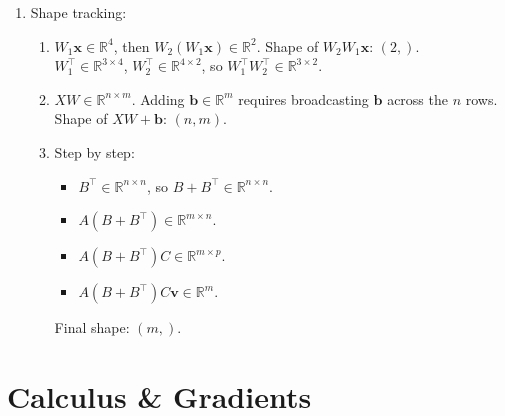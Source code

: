 \documentclass[12pt, a4paper]{scrartcl}
\begin{document}
\begin{enumerate}
\begin{enumerate}
    Note: $AA^\top \neq A^\top A$ --- they are not even the same size.
\end{enumerate}

\item Shape tracking:
\begin{enumerate}
    \item $W_1\mathbf{x} \in \mathbb{R}^4$, then $W_2(W_1\mathbf{x}) \in \mathbb{R}^2$. Shape of $W_2W_1\mathbf{x}$: $(2,)$.\\
    $W_1^\top \in \mathbb{R}^{3\times4}$, $W_2^\top \in \mathbb{R}^{4\times2}$, so $W_1^\top W_2^\top \in \mathbb{R}^{3\times2}$.

    \item $XW \in \mathbb{R}^{n\times m}$. Adding $\mathbf{b} \in \mathbb{R}^m$ requires broadcasting $\mathbf{b}$ across the $n$ rows. Shape of $XW + \mathbf{b}$: $(n, m)$.

    \item Step by step:
    \begin{itemize}
        \item $B^\top \in \mathbb{R}^{n\times n}$, so $B + B^\top \in \mathbb{R}^{n\times n}$.
        \item $A(B + B^\top) \in \mathbb{R}^{m\times n}$.
        \item $A(B + B^\top)C \in \mathbb{R}^{m\times p}$.
        \item $A(B + B^\top)C\mathbf{v} \in \mathbb{R}^{m}$.
    \end{itemize}
    Final shape: $(m,)$.
\end{enumerate}

\end{enumerate}

\section{Calculus \& Gradients}
\end{document}
